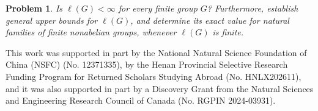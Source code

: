 \documentclass[a4paper, 12pt]{article}
\newtheorem{problem}[theorem]{Problem}
\theoremstyle{definition}
\begin{document}
\begin{problem}
Is $\ell(G)<\infty$ for every finite group $G$? Furthermore, establish
general upper bounds for $\ell(G)$, and determine its exact value for
natural families of finite nonabelian groups, whenever $\ell(G)$ is finite.
\end{problem}


\bigskip


\noindent This work was supported in part by the National Natural Science Foundation of China (NSFC) (No. 12371335), by the Henan Provincial Selective Research Funding Program for Returned Scholars Studying Abroad (No. HNLX202611), and it was also supported in part by a Discovery Grant from the Natural Sciences and Engineering Research Council of Canada (No. RGPIN 2024-03931).
\end{document}
